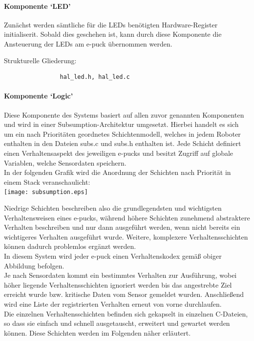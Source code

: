 \documentclass[10pt,a4paper]{article}
\begin{document}
			\paragraph*{Komponente `LED'}
			Zunächst werden sämtliche für die LEDs benötigten Hardware-Register initialiserit. Sobald dies geschehen ist, kann durch diese Komponente 
			die Ansteuerung der LEDs am e-puck übernommen werden.
			
			Strukturelle Gliederung:
				\begin{verbatim}  
				hal_led.h, hal_led.c
				\end{verbatim}

		\paragraph*{Komponente `Logic'}
			Diese Komponente des Systems basiert auf allen zuvor genannten Komponenten und wird in einer Subsumption-Architektur umgesetzt. Hierbei
			handelt es sich um ein nach Prioritäten geordnetes Schichtenmodell, welches in jedem Roboter enthalten in den Dateien subs.c und subs.h enthalten
			ist. Jede Schicht definiert einen Verhaltensaspekt des jeweiligen e-pucks und besitzt Zugriff auf globale Variablen, welche Sensordaten speichern. \\
                                    In der folgenden Grafik wird die Anordnung der Schichten nach Priorität in einem Stack veranschaulicht: \\ 

			\texttt{[image: subsumption.eps]}

			Niedrige Schichten beschreiben also die grundlegendsten und wichtigsten Verhaltensweisen eines e-pucks, während höhere Schichten zunehmend
			abstraktere Verhalten beschreiben und nur dann ausgeführt werden, wenn nicht bereits ein wichtigeres Verhalten ausgeführt wurde. Weitere,
			komplexere Verhaltensschichten können dadurch problemlos ergänzt werden.\\ 
			In diesem System wird jeder e-puck einen Verhaltenskodex gemäß obiger Abbildung befolgen. \\
			Je nach Sensordaten kommt ein bestimmtes Verhalten zur Ausführung, wobei höher liegende Verhaltensschichten ignoriert werden bis das
			angestrebte Ziel erreicht wurde bzw. kritische Daten vom Sensor gemeldet wurden. Anschließend wird eine Liste der registrierten Verhalten
			erneut von vorne durchlaufen. \\
			Die einzelnen Verhaltensschichten befinden sich gekapselt in einzelnen C-Dateien, so dass sie einfach und schnell ausgetauscht, erweitert und
			gewartet werden können. Diese Schichten werden im Folgenden näher erläutert. \\
\end{document}

